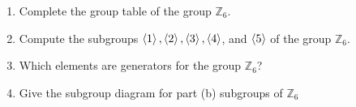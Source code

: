 \begin{exercise}
    \begin{enumerate}[label={\textbf{\alph*.}}]
        \item Complete the group table of the group $\mathbb{Z}_{6}$.
        \item Compute the subgroups $\left\langle{1}\right\rangle, \left\langle{2}\right\rangle, \left\langle{3}\right\rangle, \left\langle{4}\right\rangle$, and $\left\langle{5}\right\rangle$ of the group $\mathbb{Z}_{6}$.
        \item Which elements are generators for the group $\mathbb{Z}_{6}$?
        \item Give the subgroup diagram for part (b) subgroups of $\mathbb{Z}_{6}$
    \end{enumerate}
\end{exercise}

